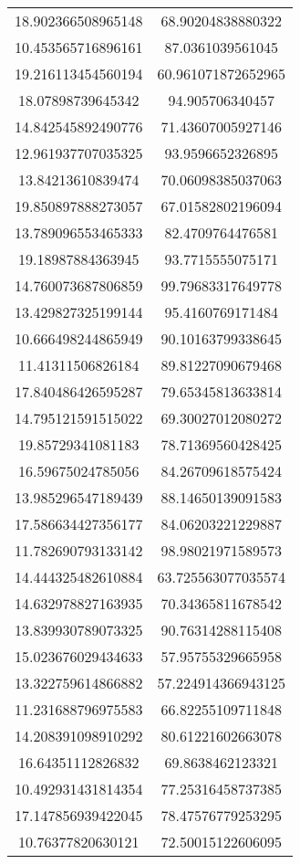 \begin{table}
\begin{tabular}{cc}
18.902366508965148 & 68.90204838880322 \\
10.453565716896161 & 87.0361039561045 \\
19.216113454560194 & 60.961071872652965 \\
18.07898739645342 & 94.905706340457 \\
14.842545892490776 & 71.43607005927146 \\
12.961937707035325 & 93.9596652326895 \\
13.84213610839474 & 70.06098385037063 \\
19.850897888273057 & 67.01582802196094 \\
13.789096553465333 & 82.4709764476581 \\
19.18987884363945 & 93.7715555075171 \\
14.760073687806859 & 99.79683317649778 \\
13.429827325199144 & 95.4160769171484 \\
10.666498244865949 & 90.10163799338645 \\
11.41311506826184 & 89.81227090679468 \\
17.840486426595287 & 79.65345813633814 \\
14.795121591515022 & 69.30027012080272 \\
19.85729341081183 & 78.71369560428425 \\
16.59675024785056 & 84.26709618575424 \\
13.985296547189439 & 88.14650139091583 \\
17.586634427356177 & 84.06203221229887 \\
11.782690793133142 & 98.98021971589573 \\
14.444325482610884 & 63.725563077035574 \\
14.632978827163935 & 70.34365811678542 \\
13.839930789073325 & 90.76314288115408 \\
15.023676029434633 & 57.95755329665958 \\
13.322759614866882 & 57.224914366943125 \\
11.231688796975583 & 66.82255109711848 \\
14.208391098910292 & 80.61221602663078 \\
16.64351112826832 & 69.8638462123321 \\
10.492931431814354 & 77.25316458737385 \\
17.147856939422045 & 78.47576779253295 \\
10.76377820630121 & 72.50015122606095 \\

\end{tabular}
\end{table}
